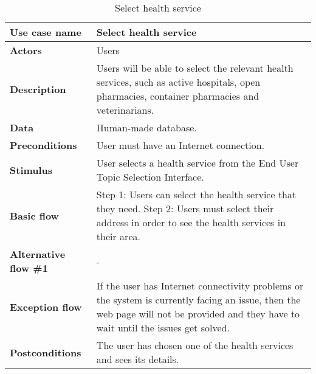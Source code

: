 \documentclass[listof=nochaptergap]{report}
\begin{document}
    \begin{table}[H]
        \centering
         \begin{tabular}{| p{4cm} | p{10cm} |} 
         \hline
         \textbf{Use case name} & Select health service \\
         \hline
         \textbf{Actors} & Users \\
         \hline
         \textbf{Description} & Users will be able to select the relevant health services, such as active hospitals, open pharmacies, container pharmacies and veterinarians. \\
         \hline
         \textbf{Data} & Human-made database. \\
         \hline
         \textbf{Preconditions} & User must have an Internet connection. \\
         \hline
         \textbf{Stimulus} & User selects a health service from the End User Topic Selection Interface. \\
         \hline
         \textbf{Basic flow} & Step 1: Users can select the health service that they need. \newline Step 2: Users must select their address in order to see the health services in their area. \\
         \hline
         \textbf{Alternative flow \#1} & - \\
         \hline
         \textbf{Exception flow} & If the user has Internet connectivity problems or the system is currently facing an issue, then the web page will not be provided and they have to wait until the issues get solved. \\
         \hline
         \textbf{Postconditions} & The user has chosen one of the health services and sees its details. \\
         \hline
         \end{tabular}
        \caption{Select health service}
        \label{tab:table8}
    \end{table}
\end{document}
